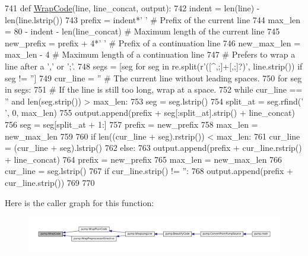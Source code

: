 \begin{DoxyCode}
741 \textcolor{keyword}{def }\hyperlink{namespacepump_a42502545a37fcd4513a0a7ac8ef3c0eb}{WrapCode}(line, line\_concat, output):
742   indent = len(line) - len(line.lstrip())
743   prefix = indent*\textcolor{stringliteral}{' '}  \textcolor{comment}{# Prefix of the current line}
744   max\_len = 80 - indent - len(line\_concat)  \textcolor{comment}{# Maximum length of the current line}
745   new\_prefix = prefix + 4*\textcolor{stringliteral}{' '}  \textcolor{comment}{# Prefix of a continuation line}
746   new\_max\_len = max\_len - 4  \textcolor{comment}{# Maximum length of a continuation line}
747   \textcolor{comment}{# Prefers to wrap a line after a ',' or ';'.}
748   segs = [seg \textcolor{keywordflow}{for} seg \textcolor{keywordflow}{in} re.split(\textcolor{stringliteral}{r'([^,;]+[,;]?)'}, line.strip()) \textcolor{keywordflow}{if} seg != \textcolor{stringliteral}{''}]
749   cur\_line = \textcolor{stringliteral}{''}  \textcolor{comment}{# The current line without leading spaces.}
750   \textcolor{keywordflow}{for} seg \textcolor{keywordflow}{in} segs:
751     \textcolor{comment}{# If the line is still too long, wrap at a space.}
752     \textcolor{keywordflow}{while} cur\_line == \textcolor{stringliteral}{''} \textcolor{keywordflow}{and} len(seg.strip()) > max\_len:
753       seg = seg.lstrip()
754       split\_at = seg.rfind(\textcolor{stringliteral}{' '}, 0, max\_len)
755       output.append(prefix + seg[:split\_at].strip() + line\_concat)
756       seg = seg[split\_at + 1:]
757       prefix = new\_prefix
758       max\_len = new\_max\_len
759 
760     \textcolor{keywordflow}{if} len((cur\_line + seg).rstrip()) < max\_len:
761       cur\_line = (cur\_line + seg).lstrip()
762     \textcolor{keywordflow}{else}:
763       output.append(prefix + cur\_line.rstrip() + line\_concat)
764       prefix = new\_prefix
765       max\_len = new\_max\_len
766       cur\_line = seg.lstrip()
767   \textcolor{keywordflow}{if} cur\_line.strip() != \textcolor{stringliteral}{''}:
768     output.append(prefix + cur\_line.strip())
769 
770 
\end{DoxyCode}
Here is the caller graph for this function\+:
\nopagebreak
\begin{figure}[H]
\begin{center}
\leavevmode
\includegraphics[width=350pt]{namespacepump_a42502545a37fcd4513a0a7ac8ef3c0eb_icgraph}
\end{center}
\end{figure}
\mbox{\label{namespacepump_a73951c98652038351b1cd24291433e12}} 
